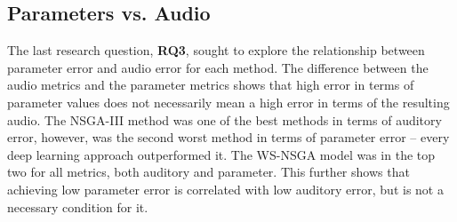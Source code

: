  



\subsection{Parameters vs. Audio}
The last research question, \textbf{RQ3}, sought to explore the relationship between parameter error and audio error for each method. The difference between the audio metrics and the parameter metrics shows that high error in terms of parameter values does not necessarily mean a high error in terms of the resulting audio. The NSGA-III method was one of the best methods in terms of auditory error, however, was the second worst method in terms of parameter error -- every deep learning approach outperformed it. The WS-NSGA model was in the top two for all metrics, both auditory and parameter. This further shows that achieving low parameter error is correlated with low auditory error, but is not a necessary condition for it.

